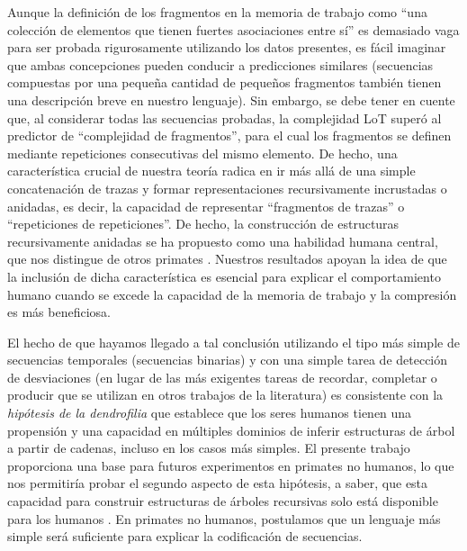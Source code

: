Aunque la definición de los fragmentos en la memoria de trabajo como ``una colección de elementos que tienen fuertes asociaciones entre sí'' \cite{f25,f110} es demasiado vaga para ser probada rigurosamente utilizando los datos presentes, es fácil imaginar que ambas concepciones pueden conducir a predicciones similares (secuencias compuestas por una pequeña cantidad de pequeños fragmentos también tienen una descripción breve en nuestro lenguaje). Sin embargo, se debe tener en cuente que, al considerar todas las secuencias probadas, la complejidad LoT superó al predictor de ``complejidad de fragmentos'', para el cual los fragmentos se definen mediante repeticiones consecutivas del mismo elemento. De hecho, una característica crucial de nuestra teoría radica en ir más allá de una simple concatenación de trazas y formar representaciones recursivamente incrustadas o anidadas, es decir, la capacidad de representar ``fragmentos de trazas'' o ``repeticiones de repeticiones''. De hecho, la construcción de estructuras recursivamente anidadas se ha propuesto como una habilidad humana central, que nos distingue de otros primates \cite{f4,f6,f7,f111}. Nuestros resultados apoyan la idea de que la inclusión de dicha característica es esencial para explicar el comportamiento humano cuando se excede la capacidad de la memoria de trabajo y la compresión es más beneficiosa.


El hecho de que hayamos llegado a tal conclusión utilizando el tipo más simple de secuencias temporales (secuencias binarias) y con una simple tarea de detección de desviaciones (en lugar de las más exigentes tareas de recordar, completar o producir que se utilizan en otros trabajos de la literatura) es consistente con la \textit{hipótesis de la dendrofilia} \cite{f8} que establece que los seres humanos tienen una propensión y una capacidad en múltiples dominios de inferir estructuras de árbol a partir de cadenas, incluso en los casos más simples. El presente trabajo proporciona una base para futuros experimentos en primates no humanos, lo que nos permitiría probar el segundo aspecto de esta hipótesis, a saber, que esta capacidad para construir estructuras de árboles recursivas solo está disponible para los humanos \cite{f4,f6,f8}. En primates no humanos, postulamos que un lenguaje más simple será suficiente para explicar la codificación de secuencias.

